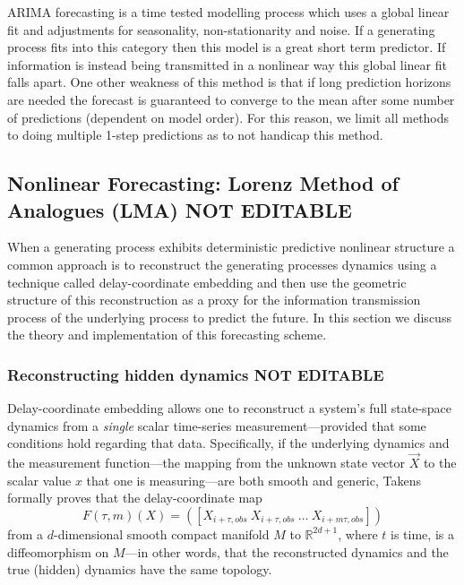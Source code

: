 ARIMA forecasting is a time tested modelling process which uses a global linear fit and adjustments for seasonality, non-stationarity and noise. If a generating process fits into this category then this model is a great short term predictor. If information is instead being transmitted in a nonlinear way this global linear fit falls apart. One other weakness of this method is that if long prediction horizons are needed the forecast is guaranteed to converge to the mean after some number of predictions (dependent on model order). For this reason, we limit all methods to doing multiple 1-step predictions as to not handicap this method. 

\subsection{Nonlinear Forecasting: Lorenz Method of Analogues (LMA){\color{red} NOT EDITABLE}}\label{sec:lma}

When a generating process exhibits deterministic predictive nonlinear structure a common approach is to reconstruct the generating processes dynamics using a technique called delay-coordinate embedding and then use the geometric structure of this reconstruction as a proxy for the information transmission process of the underlying process to predict the future. In this section we discuss the theory and implementation of this forecasting scheme. 


 \subsubsection{Reconstructing hidden dynamics {\color{red} NOT EDITABLE}}



Delay-coordinate embedding allows one to reconstruct a system's full
state-space dynamics from a \emph{single} scalar time-series
measurement---provided that some conditions hold regarding that data.
Specifically, if the underlying dynamics and the measurement
function---the mapping from the unknown state vector $\vec{X}$ to the
scalar value $x$ that one is measuring---are both smooth and generic,
Takens~\cite{takens} formally proves that the delay-coordinate map
\[
F(\tau,m)(X) = ([X_{i+\tau,obs} ~ X_{i+\tau,obs} ~ \dots ~X_{i+m\tau,obs}])
\]
from a $d$-dimensional smooth compact manifold $M$ to $\mathbb{R}^{2d+1}$,
where $t$ is time, is a diffeomorphism on $M$---in other words, that
the reconstructed dynamics and the true (hidden) dynamics have the
same topology.

